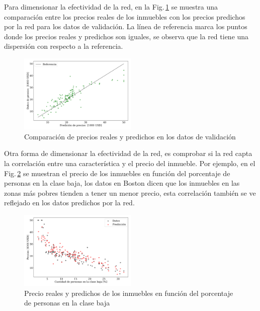     Para dimensionar la efectividad de la red, en la Fig.\,\ref{fig:ejer1_comparacion} se muestra una comparación entre los precios reales de los inmuebles con los precios predichos por la red para los datos de validación. La línea de referencia marca los puntos donde los precios reales y predichos son iguales, se observa que la red tiene una dispersión con respecto a la referencia.

    \begin{figure}[H]
        \begin{small}
            \begin{center}
                \includegraphics[width=0.5\textwidth]{Graphs/ejer1_versus.pdf}
            \end{center}
            \caption{Comparación de precios reales y predichos en los datos de validación}
            \label{fig:ejer1_comparacion}
        \end{small}
    \end{figure}

    Otra forma de dimensionar la efectividad de la red, es comprobar si la red capta la correlación entre una característica y el precio del inmueble. Por ejemplo, en el Fig.\,\ref{fig:ejer1_low_income} se muestran el precio de los inmuebles en función del porcentaje de personas en la clase baja, los datos en Boston dicen que los inmuebles en las zonas más  pobres tienden a tener un menor precio, esta correlación también se ve reflejado en los datos predichos por la red.

    \begin{figure}[H]
        \begin{small}
            \begin{center}
                \includegraphics[width=0.5\textwidth]{Graphs/ejer1_low_income.pdf}
            \end{center}
            \caption{Precio reales y predichos de los inmuebles en función del porcentaje de personas en la clase baja}
            \label{fig:ejer1_low_income}
        \end{small}
    \end{figure}

